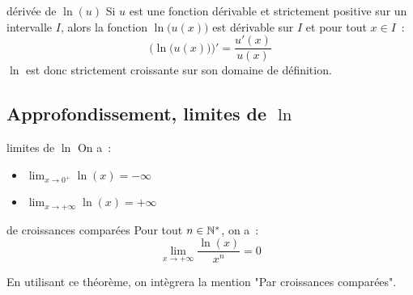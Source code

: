 \begin{proposition}{}{dérivée de $\ln(u)$}
    Si $u$ est une fonction dérivable et strictement positive sur un intervalle $I$, alors la fonction $\ln\Big(u(x)\Big)$ est dérivable sur $I$ et pour tout $x \in I$~:
    $$\big(\ln\Big(u(x)\Big)\big)' = \frac{u'(x)}{u(x)}$$
    $\ln$ est donc strictement croissante sur son domaine de définition.
\end{proposition}

\subsection{Approfondissement, limites de $\ln$}

\begin{proposition}{}{limites de $\ln$}
    On a~:
    \begin{itemize}
        \item $\displaystyle \lim_{x \to 0^+} \ln(x) = -\infty$
        \item $\displaystyle \lim_{x \to +\infty} \ln(x) = +\infty$
    \end{itemize}

\end{proposition}

\begin{theoreme}{}{de croissances comparées}
    Pour tout $n \in \mathbb{N}^*$, on a~:
    $$\lim_{x \to +\infty} \frac{\ln(x)}{x^n} = 0$$
\end{theoreme}

\begin{remarque}{}{}
    En utilisant ce théorème, on intègrera la mention "Par croissances comparées".
\end{remarque}





